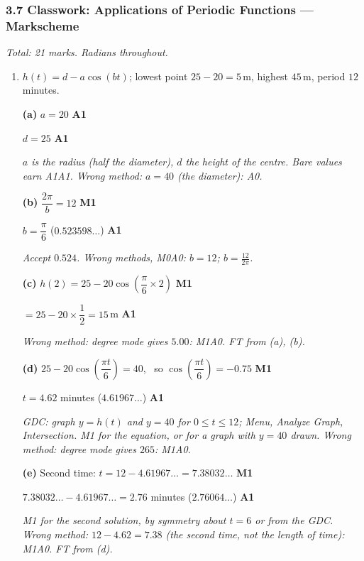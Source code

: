 \documentclass[12pt, twoside]{article}
\begin{document}
\subsubsection*{3.7 Classwork: Applications of Periodic Functions --- Markscheme}

\emph{Total: 21 marks. Radians throughout.}

\begin{enumerate}[itemsep=0.3cm]

\item[1.] [Maximum mark: 10]

$h(t) = d - a\cos(bt)$; lowest point $25 - 20 = 5$\,m, highest $45$\,m,
period $12$ minutes.

\textbf{(a)} $a = 20$ \hfill \textbf{A1}

$d = 25$ \hfill \textbf{A1}

\emph{$a$ is the radius (half the diameter), $d$ the height of the centre.
Bare values earn A1A1. Wrong method: $a = 40$ (the diameter): A0.}

\textbf{(b)} $\dfrac{2\pi}{b} = 12$ \hfill \textbf{M1}

$b = \dfrac{\pi}{6}$ \quad ($0.523598\ldots$) \hfill \textbf{A1}

\emph{Accept $0.524$. Wrong methods, M0A0: $b = 12$; $b = \frac{12}{2\pi}$.}

\textbf{(c)} $h(2) = 25 - 20\cos\left(\dfrac{\pi}{6} \times 2\right)$ \hfill \textbf{M1}

$= 25 - 20 \times \dfrac{1}{2} = 15$\,m \hfill \textbf{A1}

\emph{Wrong method: degree mode gives $5.00$: M1A0. FT from (a), (b).}

\textbf{(d)} $25 - 20\cos\left(\dfrac{\pi t}{6}\right) = 40$, \ so
$\cos\left(\dfrac{\pi t}{6}\right) = -0.75$ \hfill \textbf{M1}

$t = 4.62$ minutes \quad ($4.61967\ldots$) \hfill \textbf{A1}

\emph{\textit{GDC: graph $y = h(t)$ and $y = 40$ for $0 \le t \le 12$; Menu,
Analyze Graph, Intersection.} M1 for the equation, or for a graph with
$y = 40$ drawn. Wrong method: degree mode gives $265$: M1A0.}

\textbf{(e)} Second time: $t = 12 - 4.61967\ldots = 7.38032\ldots$ \hfill \textbf{M1}

$7.38032\ldots - 4.61967\ldots = 2.76$ minutes \quad ($2.76064\ldots$) \hfill \textbf{A1}

\emph{M1 for the second solution, by symmetry about $t = 6$ or from the
GDC. Wrong method: $12 - 4.62 = 7.38$ (the second time, not the length of
time): M1A0. FT from (d).}


\end{enumerate}
\end{document}

